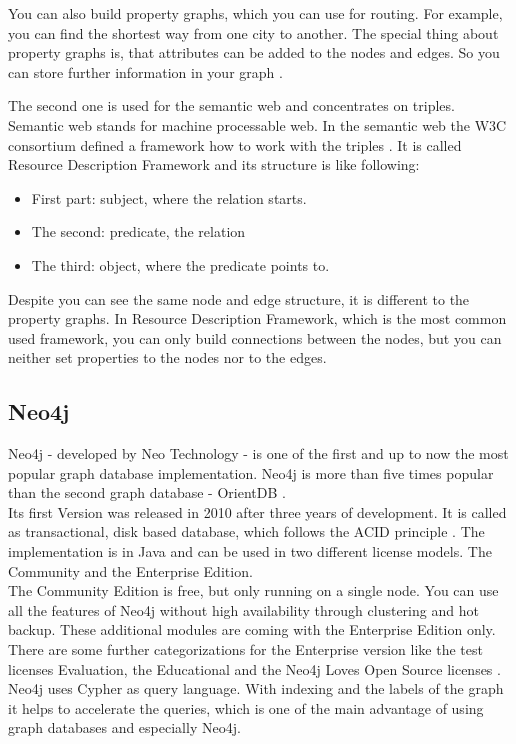 You can also build property graphs, which you can use for routing. For example, you can find the shortest way from one city to another. The special thing about property graphs is, that attributes can be added to the nodes and edges. So you can store further information in your graph \cite[p.3]{RodriguezNeubauer.2010}.

The second one is used for the semantic web and concentrates on triples. Semantic web stands for machine processable web. In the semantic web the W3C consortium defined a framework how to work with the triples \cite["Overview", para. 1]{W3C.2014}. It is called Resource Description Framework and its structure is like following:

\begin{itemize}
	\item First part: subject, where the relation starts.
	\item The second: predicate, the relation
	\item The third: object, where the predicate points to.
\end{itemize}  

Despite you can see the same node and edge structure, it is different to the property graphs. In Resource Description Framework, which is the most common used framework, you can only build connections between the nodes, but you can neither set properties to the nodes nor to the edges.

\subsection{Neo4j}

Neo4j - developed by Neo Technology - is one of the first and up to now the most popular graph database implementation. Neo4j is more than five times popular than the second graph database - OrientDB  \cite[para. 1]{SolidITGmbH.2017}.\\
Its first Version was released in 2010 after three years of development. It is called as transactional, disk based database, which follows the ACID principle \cite["Neo4j Internals", para. 4]{NeoTechnologyInc.2017b}. The implementation is in Java and can be used in two different license models. The Community and the Enterprise Edition.\\
The Community Edition is free, but only running on a single node. You can use all the features of Neo4j without high availability through clustering and hot backup. 
These additional modules are coming with the Enterprise Edition only. There are some further categorizations for the Enterprise version like the test licenses Evaluation, the Educational and the Neo4j Loves Open Source licenses \cite["About Neo4j Licenses", para. 1]{NeoTechnologyInc.2017a}.\\
Neo4j uses Cypher as query language. With indexing and the labels of the graph it helps to accelerate the queries, which is one of the main advantage of using graph databases and especially Neo4j.

